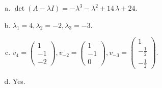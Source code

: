 \begin{questions}
\begin{solution}
\begin{enumerate}[(a)]
\item $\det(A-\lambda I)=-{\lambda}^{3} - {\lambda}^{2} + 14 \, {\lambda} + 24$.
\item ${\lambda}_1=4, {\lambda}_2=-2, {\lambda}_3=-3$.
\item $v_{4}=\left(\begin{array}{r}
1 \\
-1 \\
-2
\end{array}\right), v_{-2}=\left(\begin{array}{r}
1 \\
-1 \\
0
\end{array}\right), v_{-3}=\left(\begin{array}{r}
1 \\
-\frac{1}{2} \\
-\frac{1}{2}
\end{array}\right)$.
\item Yes.
\end{enumerate}
\end{solution}

\end{questions}

\newpage


\begin{center}
\end{center}

